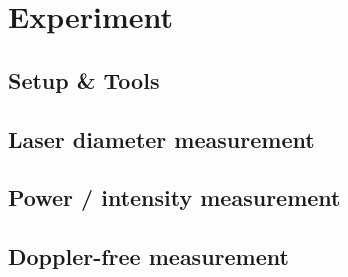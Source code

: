 
\chapter{Experiment}

\ifpdf
    \graphicspath{{Chapter2/Figs/Raster/}{Chapter2/Figs/PDF/}{Chapter2/Figs/}}
\else
    \graphicspath{{Chapter2/Figs/Vector/}{Chapter2/Figs/}}
\fi


\section{Setup \& Tools} %


\section{Laser diameter measurement} %


\section{Power / intensity measurement} %


\section{Doppler-free measurement} %

